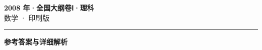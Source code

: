 \documentclass[zihao=5, a4paper]{ctexart}
\begin{document}
\begin{center}
  {\Large\bfseries 2008 年·全国大纲卷Ⅰ·理科}\\[4pt]
  {\large 数学 · 印刷版}
\end{center}
\medskip
{}

\par\bigskip\hrule\bigskip
{}
\begin{center}{\large\bfseries 参考答案与详细解析}\end{center}
\smallskip

\end{document}
